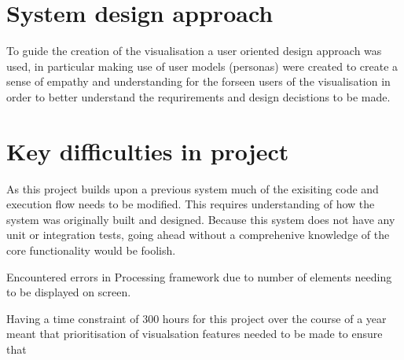 \section{System design approach}
To guide the creation of the visualisation a user oriented design approach was used, in particular making use of user models (personas) were created to create a sense of empathy and understanding for the forseen users of the visualisation in order to better understand the requrirements and design decistions to be made. 

\section{Key difficulties in project}
As this project builds upon a previous system much of the exisiting code and execution flow needs to be modified. This requires understanding of how the system was originally built and designed. Because this system does not have any unit or integration tests, going ahead without a comprehenive knowledge of the core functionality would be foolish.

Encountered errors in Processing framework due to number of elements needing to be displayed on screen. 

Having a time constraint of 300 hours for this project over the course of a year meant that prioritisation of visualsation features needed to be made to ensure that 

